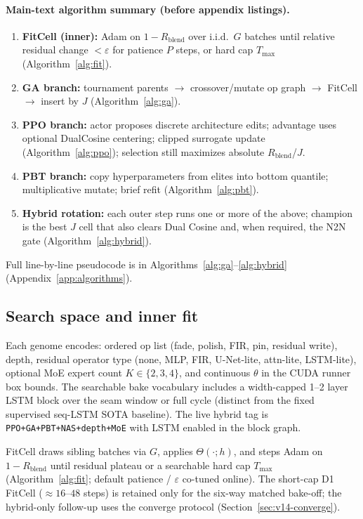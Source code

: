 \paragraph{Main-text algorithm summary (before appendix listings).}
\begin{enumerate}
  \item \textbf{FitCell (inner):} Adam on $1-R_{\mathrm{blend}}$ over i.i.d.\ $G$ batches until relative residual change $<\varepsilon$ for patience $P$ steps, or hard cap $T_{\max}$ (Algorithm~\ref{alg:fit}).
  \item \textbf{GA branch:} tournament parents $\to$ crossover/mutate op graph $\to$ FitCell $\to$ insert by $J$ (Algorithm~\ref{alg:ga}).
  \item \textbf{PPO branch:} actor proposes discrete architecture edits; advantage uses optional DualCosine centering; clipped surrogate update (Algorithm~\ref{alg:ppo}); selection still maximizes absolute $R_{\mathrm{blend}}$/$J$.
  \item \textbf{PBT branch:} copy hyperparameters from elites into bottom quantile; multiplicative mutate; brief refit (Algorithm~\ref{alg:pbt}).
  \item \textbf{Hybrid rotation:} each outer step runs one or more of the above; champion is the best $J$ cell that also clears Dual Cosine and, when required, the N2N gate (Algorithm~\ref{alg:hybrid}).
\end{enumerate}
Full line-by-line pseudocode is in Algorithms~\ref{alg:ga}--\ref{alg:hybrid} (Appendix~\ref{app:algorithms}).



\subsection{Search space and inner fit}
\label{sec:search-space}

Each genome encodes: ordered op list (fade, polish, FIR, pin, residual write), depth, residual operator type (none, MLP, FIR, U-Net-lite, attn-lite, LSTM-lite), optional MoE expert count $K\in\{2,3,4\}$, and continuous $\theta$ in the CUDA runner box bounds.
The searchable bake vocabulary includes a width-capped 1--2 layer LSTM block over the seam window or full cycle (distinct from the fixed supervised seq-LSTM SOTA baseline).
The live hybrid tag is \texttt{PPO+GA+PBT+NAS+depth+MoE} with LSTM enabled in the block graph.

FitCell draws sibling batches via $G$, applies $\Theta(\cdot;h)$, and steps Adam on $1-R_{\mathrm{blend}}$ until residual plateau or a searchable hard cap $T_{\max}$ (Algorithm~\ref{alg:fit}; default patience / $\varepsilon$ co-tuned online).
The short-cap D1 FitCell (${\approx}16$--$48$ steps) is retained only for the six-way matched bake-off; the hybrid-only follow-up uses the converge protocol (Section~\ref{sec:v14-converge}).

